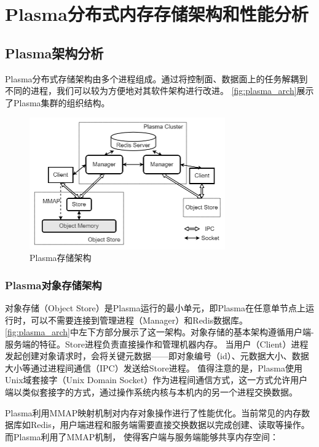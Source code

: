 \chapter{Plasma分布式内存存储架构和性能分析}

\section{Plasma架构分析}

Plasma分布式存储架构由多个进程组成。通过将控制面、数据面上的任务解耦到不同的进程，我们可以较为方便地对其软件架构进行改进。
\autoref{fig:plasma_arch}展示了Plasma集群的组织结构。

\begin{figure}[h] 
    \centering
    \includegraphics[width=0.75\textwidth]{image/chap02/plasma_arch.png}
    \caption{Plasma存储架构}
    \label{fig:plasma_arch}
\end{figure}

\subsection{Plasma对象存储架构}

对象存储（Object Store）是Plasma运行的最小单元，即Plasma在任意单节点上运行时，可以不需要连接到管理进程（Manager）和Redis数据库。
\autoref{fig:plasma_arch}中左下方部分展示了这一架构。对象存储的基本架构遵循用户端-服务端的特征。Store进程负责直接操作和管理机器内存。
当用户（Client）进程发起创建对象请求时，会将关键元数据——即对象编号（id）、元数据大小、数据大小等通过进程间通信（IPC）发送给Store进程。
值得注意的是，Plasma使用Unix域套接字（Unix Domain Socket）作为进程间通信方式，这一方式允许用户端以类似套接字的方式，通过操作系统内核与本机内的另一个进程交换数据。

Plasma利用MMAP映射机制对内存对象操作进行了性能优化。当前常见的内存数据库如Redis，用户端进程和服务端需要直接交换数据以完成创建、读取等操作。而Plasma利用了MMAP机制，
使得客户端与服务端能够共享内存空间：

